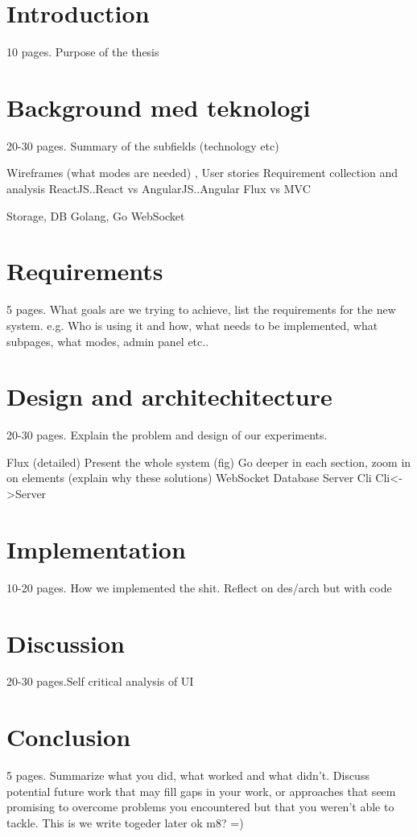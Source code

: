 \documentclass[12pt, a4paper]{report}
\begin{document}
\section{Introduction}
10 pages. Purpose of the thesis

\section{Background med teknologi}
20-30 pages. Summary of the subfields (technology etc)

Wireframes (what modes are needed) , User stories
Requirement collection and analysis
ReactJS..React vs AngularJS..Angular
Flux vs MVC

Storage, DB
Golang, Go
WebSocket

\section{Requirements}
5 pages. What goals are we trying to achieve, list the requirements for the new system.
e.g. Who is using it and how, what needs to be implemented, what subpages, what modes, admin panel etc..

\section{Design and architechitecture}
20-30 pages. Explain the problem and design of our experiments.

Flux (detailed)
Present the whole system (fig)
 Go deeper in each section, zoom in on elements (explain why these solutions)
WebSocket
Database
Server
Cli
Cli<->Server

\section{Implementation}
10-20 pages. How we implemented the shit.
Reflect on des/arch but with code

\section{Discussion}
20-30 pages.Self critical analysis of UI

\section{Conclusion}
5 pages. Summarize what you did, what worked and what didn’t.
Discuss potential future work that may fill gaps in your work, or approaches that
seem promising to overcome problems you encountered but that you weren’t able
to tackle.
This is we write togeder later ok m8? =)
\end{document}
